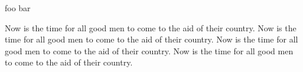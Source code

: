 \documentclass{article}
\begin{document}
foo%
bar


    Now is the time for all good men to come to the aid of their country. Now %
    is the time for all good men to come to the aid of their country. %
    Now is the time for all good men to come to the aid of their country. Now%
    is the time for all good men to come to the aid of their country.%
\end{document}
